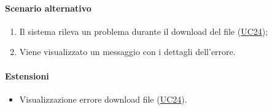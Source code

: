\paragraph*{Scenario alternativo}
\begin{enumerate}
  \item Il sistema rileva un problema durante il download del file (\hyperref[UC24]{UC24});
  \item Viene visualizzato un messaggio con i dettagli dell'errore.
\end{enumerate}

\paragraph*{Estensioni}
\begin{itemize}
  \item Visualizzazione errore download file (\hyperref[UC24]{UC24}).
\end{itemize}